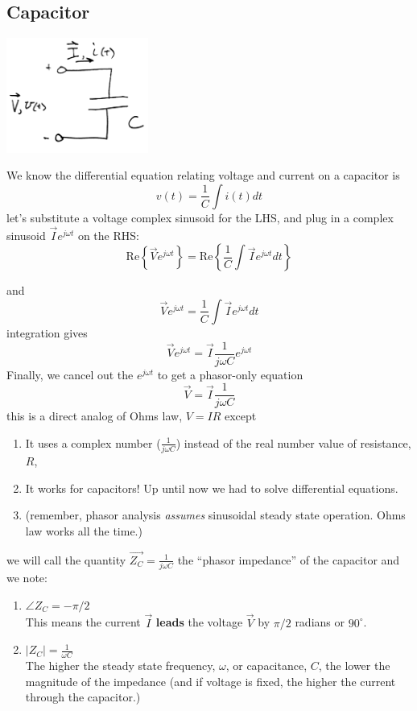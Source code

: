 \subsection{Capacitor}



\includegraphics[width=0.35\textwidth]{figsChapt02/MI65790.png}

We know the differential equation relating voltage and current on a capacitor is
\[
v(t) = \frac {1}  {C}\int i(t) dt
\]
let's substitute a voltage complex sinusoid for the LHS, and plug in a complex sinusoid $\vec{I}e^{j\omega t}$
on the RHS:
\[
\mathrm{Re}\left \{\vec{V}e^{j\omega t} \right\} = \mathrm{Re}\left \{\frac {1}  {C}  \int \vec{I}e^{j\omega t} dt \right\}
\]

and
\[
\vec{V}e^{j\omega t} = \frac {1}  {C}  \int \vec{I}e^{j\omega t} dt
\]
integration gives
\[
\vec{V}e^{j\omega t} =  \vec{I}\frac {1}  {j\omega C}   e^{j\omega t}
\]
Finally, we cancel out the $e^{j\omega t}$ to get a phasor-only equation
\[
\vec{V} = \vec{I} \frac {1}  {j\omega C}
\]
this is a direct analog of Ohms law, $V=IR$ except
\begin{enumerate}
  \item  It uses a complex number ($ \frac {1}  {j\omega C}$) instead of the real number value of resistance, $R$,\vspace{0.2in}
  \item  It works for capacitors!   Up until now we had to solve differential equations.\vspace{0.2in}
  \item (remember, phasor analysis {\it assumes} sinusoidal steady state operation. Ohms law works all the time.)\vspace{0.2in}
\end{enumerate}
we will call the quantity $\vec{Z_C} =  \frac {1}  {j\omega C}$ the ``phasor impedance'' of the capacitor and we note:

\begin{enumerate}
  \item $\angle{Z_C} = -\pi/2$\\
  This means the current $\vec{I}$ {\bf leads} the voltage $\vec{V}$ by $\pi/2$ radians or $90^\circ$.\vspace{0.2in}
  \item $|Z_C| = \frac {1}  {\omega C}$\\[2mm]
  The higher the steady state frequency, $\omega$, or capacitance, $C$, the lower the magnitude of the impedance (and if voltage is fixed,
  the higher the current through the capacitor.)\vspace{0.2in}
\end{enumerate}

